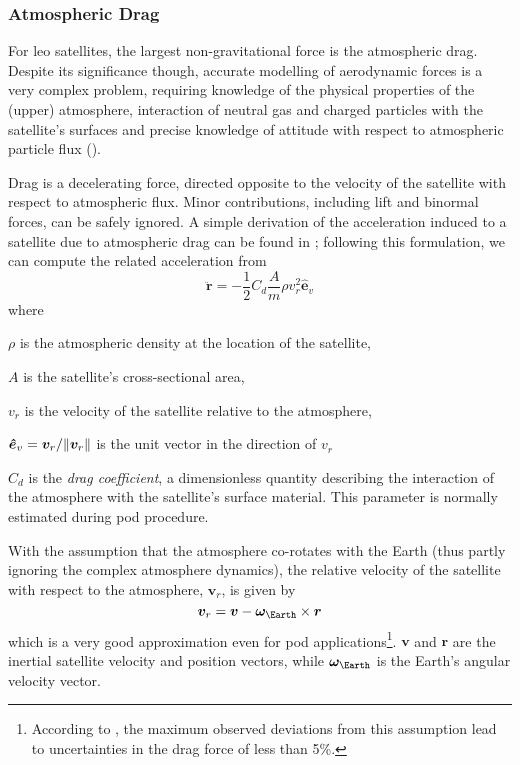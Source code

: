 \subsubsection{Atmospheric Drag}\label{sssec:atmospheric-drag}

For \gls{leo} satellites, the largest non-gravitational force is the atmospheric 
drag. Despite its significance though, accurate modelling of aerodynamic forces 
is a very complex problem, requiring knowledge of the physical properties of the 
(upper) atmosphere, interaction of neutral gas and charged particles with the satellite's 
surfaces and precise knowledge of attitude with respect to atmospheric particle 
flux (\cite{Montenbruck2000}).

Drag is a decelerating force, directed opposite to the velocity of the satellite 
with respect to atmospheric flux. Minor contributions, including lift and binormal 
forces, can be safely ignored. A simple derivation of the acceleration induced 
to a satellite due to atmospheric drag can be found in \cite{Montenbruck2000}; 
following this formulation, we can compute the related acceleration from
\begin{equation}\label{eq:mont397}
  \bm{\ddot{r}} = -\frac{1}{2} C_{d} \frac{A}{m} \rho v_{r}^{2} \bm{\hat{e}}_v
\end{equation}
where
\begin{description}
  \item $\rho$ is the atmospheric density at the location of the satellite,
  \item $A$ is the satellite's cross-sectional area,
  \item $v_r$ is the velocity of the satellite relative to the atmosphere,
  \item $\bm{\hat{e}}_v = \bm{v}_r / \lVert\bm{v}_r\rVert$ is the unit vector in the 
    direction of $v_r$
  \item $C_d$ is the \emph{drag coefficient}, a dimensionless quantity describing the 
    interaction of the atmosphere with the satellite's surface material. This parameter 
    is normally estimated during \gls{pod} procedure.
\end{description}

With the assumption that the atmosphere co-rotates with the Earth (thus partly 
ignoring the complex atmosphere dynamics), the relative velocity of the satellite 
with respect to the atmosphere, $\bm{v}_r$, is given by
\begin{equation}\label{eq:mont398}
  \bm{v}_r = \bm{v} - \bm{\omega}_{\Earth} \times \bm{r}
\end{equation}
which is a very good approximation even for \gls{pod} applications\footnote{According 
to \cite{Montenbruck2000}, the maximum observed deviations from this assumption 
lead to uncertainties in the drag force of less than 5\%.}. $\bm{v}$ and $\bm{r}$ 
are the inertial satellite velocity and position vectors, while 
$\bm{\omega}_{\Earth}$ is the Earth's angular velocity vector.


